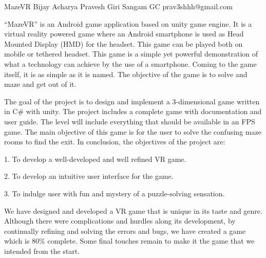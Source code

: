  \begin{conf-abstract}[]
 {MazeVR }
 {Bijay Acharya Pravesh Giri Sangam GC
 }
{prav3shhh@gmail.com}

“MazeVR” is an Android game application based on unity game engine. It is a virtual reality powered game where an Android smartphone is used as Head Mounted Display (HMD) for the headset. This game can be played both on mobile or tethered headset. This game is a simple yet powerful demonstration of what a technology can achieve by the use of a smartphone. Coming to the game itself, it is as simple as it is named. The objective of the game is to solve and maze and get out of it.

The goal of the project is to design and implement a 3-dimensional game written in C\# with unity. The project includes a complete game with documentation and user guide. The level will include everything that should be available in an FPS game. The main objective of this game is for the user to solve the confusing maze rooms to find the exit. 
In conclusion, the objectives of the project are:

1.    To develop a well-developed and well refined VR game.

2.    To develop an intuitive user interface for the game.

3.    To indulge user with fun and mystery of a puzzle-solving sensation.

We have designed and developed a VR game that is unique in its taste and genre. Although there were complications and hurdles along its development, by continually refining and solving the errors and bugs, we have created a game which is 80\% complete. Some final touches remain to make it the game that we intended from the start.
 \end{conf-abstract}
